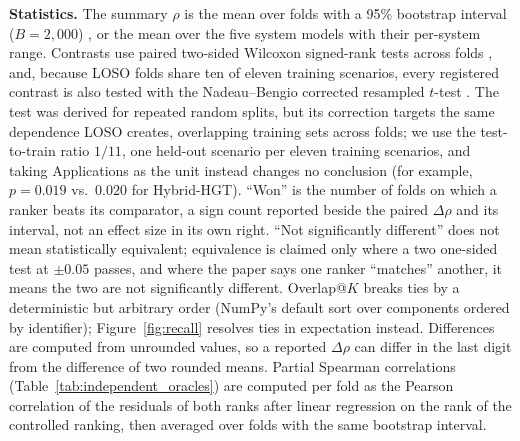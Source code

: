 \noindent\textbf{Statistics.} The summary $\rho$ is the mean over folds with a 95\% bootstrap interval ($B = 2{,}000$) \cite{efron1993introduction}, or the mean over the five system models with their per-system range. Contrasts use paired two-sided Wilcoxon signed-rank tests across folds \cite{wilcoxon1945individual,arcuri2011practical}, and, because LOSO folds share ten of eleven training scenarios, every registered contrast is also tested with the Nadeau--Bengio corrected resampled $t$-test \cite{nadeau2003inference}. The test was derived for repeated random splits, but its correction targets the same dependence LOSO creates, overlapping training sets across folds; we use the test-to-train ratio $1/11$, one held-out scenario per eleven training scenarios, and taking Applications as the unit instead changes no conclusion (for example, $p = 0.019$ vs.\ $0.020$ for Hybrid-HGT). ``Won'' is the number of folds on which a ranker beats its comparator, a sign count reported beside the paired $\Delta\rho$ and its interval, not an effect size in its own right. ``Not significantly different'' does not mean statistically equivalent; equivalence is claimed only where a two one-sided test at $\pm 0.05$ passes, and where the paper says one ranker ``matches'' another, it means the two are not significantly different. Overlap@$K$ breaks ties by a deterministic but arbitrary order (NumPy's default sort over components ordered by identifier); Figure~\ref{fig:recall} resolves ties in expectation instead. Differences are computed from unrounded values, so a reported $\Delta\rho$ can differ in the last digit from the difference of two rounded means. Partial Spearman correlations (Table~\ref{tab:independent_oracles}) are computed per fold as the Pearson correlation of the residuals of both ranks after linear regression on the rank of the controlled ranking, then averaged over folds with the same bootstrap interval.


